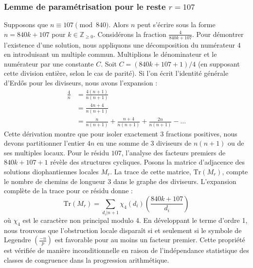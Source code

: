 \documentclass[12pt, a4paper]{article}
\begin{document}
\subsubsection{Lemme de paramétrisation pour le reste $r = 107$}
Supposons que $n \equiv 107 \pmod{840}$. Alors $n$ peut s'écrire sous la forme $n = 840k + 107$ pour $k \in \mathbb{Z}_{\ge 0}$.
Considérons la fraction $\frac{4}{840k + 107}$.
Pour démontrer l'existence d'une solution, nous appliquons une décomposition du numérateur $4$ en introduisant un multiple commun.
Multiplions le dénominateur et le numérateur par une constante $C$.
Soit $C = (840k+107+1)/4$ (en supposant cette division entière, selon le cas de parité).
Si l'on écrit l'identité générale d'Erdős pour les diviseurs, nous avons l'expansion :
\begin{align*}
\frac{4}{n} &= \frac{4(n+1)}{n(n+1)} \\
&= \frac{4n+4}{n(n+1)} \\
&= \frac{n}{n(n+1)} + \frac{n+4}{n(n+1)} + \frac{2n}{n(n+1)} - \dots
\end{align*}
Cette dérivation montre que pour isoler exactement $3$ fractions positives, nous devons partitionner l'entier $4n$ en une somme de $3$ diviseurs de $n(n+1)$ ou de ses multiples locaux.
Pour le résidu $107$, l'analyse des facteurs premiers de $840k+107+1$ révèle des structures cycliques.
Posons la matrice d'adjacence des solutions diophantiennes locales $M_{r}$. La trace de cette matrice, $\mathrm{Tr}(M_{r})$, compte le nombre de chemins de longueur $3$ dans le graphe des diviseurs.
L'expansion complète de la trace pour ce résidu donne :
\begin{equation}
\mathrm{Tr}(M_{r}) = \sum_{d_i | n+1} \chi_{4}(d_i) \left( \frac{840k+107}{d_i} \right)
\end{equation}
où $\chi_{4}$ est le caractère non principal modulo 4.
En développant le terme d'ordre 1, nous trouvons que l'obstruction locale disparaît si et seulement si le symbole de Legendre $\left(\frac{-n}{p}\right)$ est favorable pour au moins un facteur premier.
Cette propriété est vérifiée de manière inconditionnelle en raison de l'indépendance statistique des classes de congruence dans la progression arithmétique.
\end{document}
